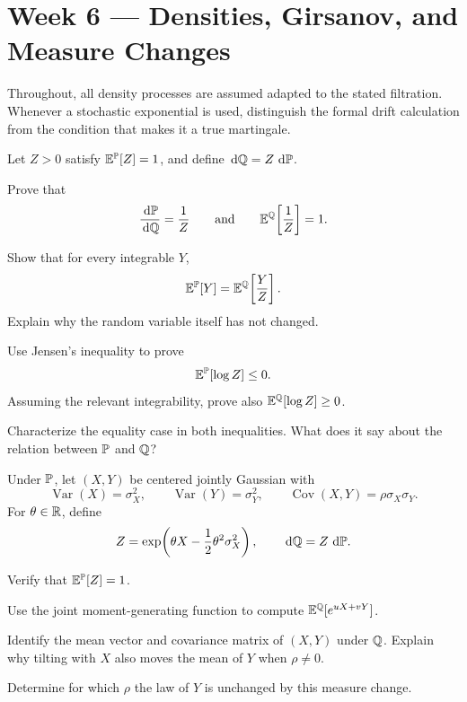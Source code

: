 \section{Week 6 --- Densities, Girsanov, and Measure Changes}

Throughout, all density processes are assumed adapted to the stated
filtration. Whenever a stochastic exponential is used, distinguish the
formal drift calculation from the condition that makes it a true martingale.

\ifIncludeCore

\setcounter{exercise}{0}
\begin{exercise}
Let \(Z>0\) satisfy \(\mathbb E^{\mathbb P}[Z]=1\), and define
\(\,\mathrm d\mathbb Q=Z\,\,\mathrm d\mathbb P\).
\begin{exparts}
  \item Prove that
  \[
  \frac{\,\mathrm d\mathbb P}{\,\mathrm d\mathbb Q}=\frac1Z
  \qquad\text{and}\qquad
  \mathbb E^{\mathbb Q}\!\left[\frac1Z\right]=1.
  \]
  \item Show that for every integrable \(Y\),
  \[
  \mathbb E^{\mathbb P}[Y]=\mathbb E^{\mathbb Q}\!\left[\frac{Y}{Z}\right].
  \]
  Explain why the random variable itself has not changed.
  \item Use Jensen's inequality to prove
  \[
  \mathbb E^{\mathbb P}[\log Z]\leq0.
  \]
  Assuming the relevant integrability, prove also
  \(\mathbb E^{\mathbb Q}[\log Z]\geq0\).
  \item Characterize the equality case in both inequalities. What does it
  say about the relation between \(\mathbb P\) and \(\mathbb Q\)?
\end{exparts}
\end{exercise}

\begin{exercise}
Under \(\mathbb P\), let \((X,Y)\) be centered jointly Gaussian with
\[
\operatorname{Var}(X)=\sigma_X^2,\qquad
\operatorname{Var}(Y)=\sigma_Y^2,\qquad
\operatorname{Cov}(X,Y)=\rho\sigma_X\sigma_Y.
\]
For \(\theta\in\mathbb{R}\), define
\[
Z=\exp\!\left(\theta X-\frac12\theta^2\sigma_X^2\right),
\qquad \,\mathrm d\mathbb Q=Z\,\,\mathrm d\mathbb P.
\]
\begin{exparts}
  \item Verify that \(\mathbb E^{\mathbb P}[Z]=1\).
  \item Use the joint moment-generating function to compute
  \(\mathbb E^{\mathbb Q}[e^{uX+vY}]\).
  \item Identify the mean vector and covariance matrix of \((X,Y)\) under
  \(\mathbb Q\). Explain why tilting with \(X\) also moves the mean of \(Y\)
  when \(\rho\neq0\).
  \item Determine for which \(\rho\) the law of \(Y\) is unchanged by this
  measure change.
\end{exparts}
\end{exercise}

